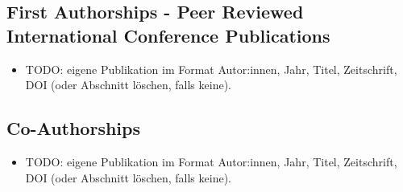 \subsection*{First Authorships - Peer Reviewed International Conference Publications} \label{sec:publications:peer_reviewed_conf_first}

\begin{itemize}
    \item[] TODO: eigene Publikation im Format Autor:innen, Jahr, Titel, Zeitschrift, DOI (oder Abschnitt löschen, falls keine).
\end{itemize}

\subsection*{Co-Authorships} \label{sec:publications:other_co}

\begin{itemize}
    \item[] TODO: eigene Publikation im Format Autor:innen, Jahr, Titel, Zeitschrift, DOI (oder Abschnitt löschen, falls keine).
\end{itemize}
